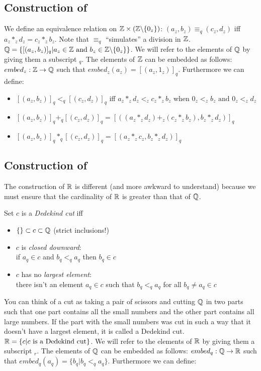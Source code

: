 \subsection{Construction of \Q}

We define an equivalence relation on $\mathbb Z \times (\mathbb Z \backslash
\{0_z\})$: $(a_z,b_z) \equiv_q (c_z,d_z)$ iff $a_z *_z d_z = c_z *_z
b_z$. Note that $\equiv_q$ ``simulates'' a division in $\mathbb Z$. $\mathbb Q =
\{[(a_z,b_z)]_q | a_z \in \mathbb Z \mbox{ and } b_z \in \mathbb Z \backslash
\{0_z\}\}$. We will refer to the elements of $\mathbb Q$ by giving them a
subscript $_q$. The elements of $\mathbb Z$ can be embedded as follows:
$embed_z: \mathbb Z \rightarrow \mathbb Q$ such that $embed_z(a_z) =
[(a_z,1_z)]_q$. Furthermore we can define:
\begin{itemize}
  \item $[(a_z,b_z)]_q <_q [(c_z,d_z)]_q$ iff $a_z *_z d_z <_z c_z *_z b_z$
  when $0_z <_z b_z \mbox{ and } 0_z <_z d_z$
  \item $[(a_z,b_z)]_q +_q [(c_z,d_z)]_q = [\left((a_z *_z d_z) +_z (c_z *_z
    b_z), b_z *_z d_z\right)]_q$
  \item $[(a_z,b_z)]_q *_q [(c_z,d_z)]_q = [(a_z *_z c_z, b_z *_z d_z)]_q$
\end{itemize}

\subsection{Construction of \R}

The construction of $\mathbb R$ is different (and more awkward to understand)
because we must ensure that the cardinality of $\mathbb R$ is greater than that
of $\mathbb Q$.

Set $c$ is a \emph{Dedekind cut} iff
\begin{itemize}
  \item $\{\} \subset c \subset \mathbb Q$ (strict inclusions!)
  \item $c$ is \emph{closed downward}: \\
  if $a_q \in c$ and $b_q <_q a_q$ then $b_q \in c$
  \item $c$ has no \emph{largest element}: \\
      there isn't an element $a_q \in c$ such that $b_q <_q a_q$ for all $b_q
      \neq a_q \in c$
\end{itemize}

You can think of a cut as taking a pair of scissors and cutting $\mathbb Q$ in
two parts such that one part contains all the small numbers and the
other part contains all large numbers. If the part with the small
numbers was cut in such a way that it doesn't have a largest element, it
is called a Dedekind cut.  $\mathbb R = \{c | c \mbox{ is a Dedekind
  cut}\}$. We will refer to the elements of $\mathbb R$ by giving them a
subscript $_r$. The elements of $\mathbb Q$ can be embedded as follows:
$embed_q: \mathbb Q \rightarrow \mathbb R$ such that $embed_q(a_q) = \{b_q | b_q <_q
a_q\}$. Furthermore we can define:

